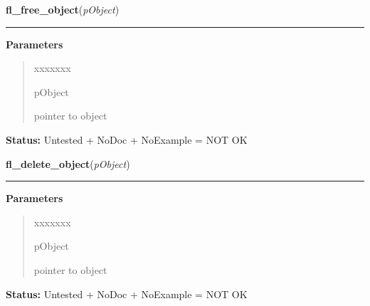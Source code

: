 \hspace{.8\funcindent}\begin{boxedminipage}{\funcwidth}

    \raggedright \textbf{fl\_free\_object}(\textit{pObject})

    \vspace{-1.5ex}

    \rule{\textwidth}{0.5\fboxrule}
\setlength{\parskip}{2ex}
\setlength{\parskip}{1ex}
      \textbf{Parameters}
      \vspace{-1ex}

      \begin{quote}
        \begin{Ventry}{xxxxxxx}

          \item[pObject]

          pointer to object

        \end{Ventry}

      \end{quote}

\textbf{Status:} Untested + NoDoc + NoExample = NOT OK



    \end{boxedminipage}

    \label{xformslib:library:fl_delete_object}

    \vspace{0.5ex}

\hspace{.8\funcindent}\begin{boxedminipage}{\funcwidth}

    \raggedright \textbf{fl\_delete\_object}(\textit{pObject})

    \vspace{-1.5ex}

    \rule{\textwidth}{0.5\fboxrule}
\setlength{\parskip}{2ex}
\setlength{\parskip}{1ex}
      \textbf{Parameters}
      \vspace{-1ex}

      \begin{quote}
        \begin{Ventry}{xxxxxxx}

          \item[pObject]

          pointer to object

        \end{Ventry}

      \end{quote}

\textbf{Status:} Untested + NoDoc + NoExample = NOT OK



    \end{boxedminipage}

